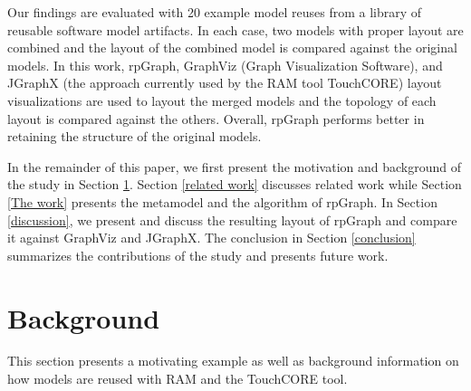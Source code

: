 Our findings are evaluated with 20 example model reuses from a library of reusable software model artifacts. In each case, two models with proper layout are combined and the layout of the combined model is compared against the original models. In this work, rpGraph, GraphViz (Graph Visualization Software), and JGraphX  (the approach currently used by the RAM tool TouchCORE) layout visualizations are used to layout the merged models and the topology of each layout is compared against the others.  Overall, rpGraph performs better in retaining the structure of the original models.   

In the remainder of this paper, we first present the motivation and background of the study in Section \ref{background}. Section \ref{related work} discusses related work while Section \ref{The work} presents the metamodel and the algorithm of rpGraph. In Section \ref{discussion}, we present and discuss the resulting layout of rpGraph and compare it against GraphViz and JGraphX.  The conclusion in Section \ref{conclusion} summarizes the contributions of the study and presents future work.

\section{Background} \label{background}
This section presents a motivating example as well as background information on how models are reused with RAM and the TouchCORE tool.


